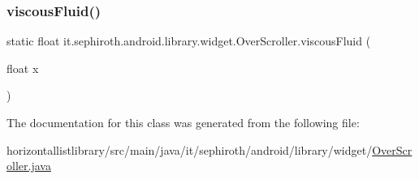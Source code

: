 \subsubsection{\texorpdfstring{viscous\+Fluid()}{viscousFluid()}}
{\footnotesize\ttfamily static float it.\+sephiroth.\+android.\+library.\+widget.\+Over\+Scroller.\+viscous\+Fluid (\begin{DoxyParamCaption}\item[{float}]{x }\end{DoxyParamCaption})\hspace{0.3cm}{\ttfamily [static]}}



The documentation for this class was generated from the following file\+:\begin{DoxyCompactItemize}
\item 
horizontallistlibrary/src/main/java/it/sephiroth/android/library/widget/\hyperlink{_over_scroller_8java}{Over\+Scroller.\+java}\end{DoxyCompactItemize}
